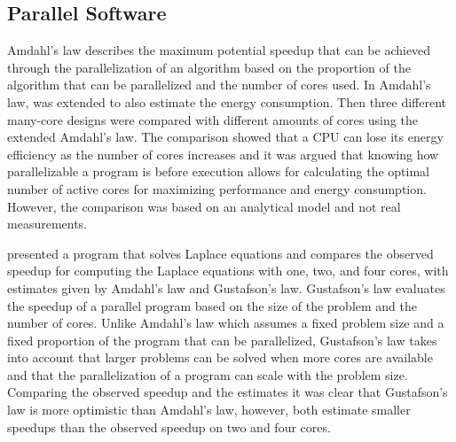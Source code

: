 \subsection{Parallel Software}

Amdahl's law describes the maximum potential speedup that can be achieved through the parallelization of an algorithm based on the proportion of the algorithm that can be parallelized and the number of cores used.\cite{amdahl1967validity} In \cite{woo2008extending} Amdahl's law, was extended to also estimate the energy consumption.  Then three different many-core designs were compared with different amounts of cores using the extended Amdahl's law. The comparison showed that a CPU can lose its energy efficiency as the number of cores increases and it was argued that knowing how parallelizable a program is before execution allows for calculating the optimal number of active cores for maximizing performance and energy consumption. However, the comparison was based on an analytical model and not real measurements.\cite{woo2008extending}

\cite{prinslow2011overview} presented a program that solves Laplace equations and compares the observed speedup for computing the Laplace equations with one, two, and four cores, with estimates given by Amdahl's law and Gustafson's law.  Gustafson's law evaluates the speedup of a parallel program based on the size of the problem and the number of cores. Unlike Amdahl's law which assumes a fixed problem size and a fixed proportion of the program that can be parallelized, Gustafson's law takes into account that larger problems can be solved when more cores are available and that the parallelization of a program can scale with the problem size. Comparing the observed speedup and the estimates it was clear that Gustafson's law is more optimistic than Amdahl's law, however, both estimate smaller speedups than the observed speedup on two and four cores. \cite{prinslow2011overview}


